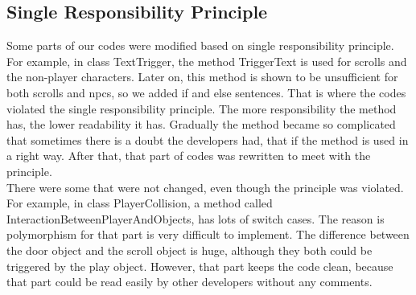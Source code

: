 \documentclass[12pt, a4paper]{report}
\begin{document}
		\subsection {Single Responsibility Principle}
			Some parts of our codes were modified based on single responsibility principle. For example, in class TextTrigger, the method TriggerText is used for scrolls and the non-player characters. Later on, this method is shown to be unsufficient for both scrolls and npcs, so we added if and else sentences. That is where the codes violated the single responsibility principle. The more responsibility the method has, the lower readability it has. Gradually the method became so complicated that sometimes there is a doubt the developers had, that if the method is used in a right way. After that, that part of codes was rewritten to meet with the principle. \\
			There were some that were not changed, even though the principle was violated. For example, in class PlayerCollision, a method called InteractionBetweenPlayerAndObjects, has lots of switch cases. The reason is polymorphism for that part is very difficult to implement. The difference between the door object and the scroll object is huge, although they both could be triggered by the play object. However, that part keeps the code clean, because that part could be read easily by other developers without any comments. \\
\end{document}
